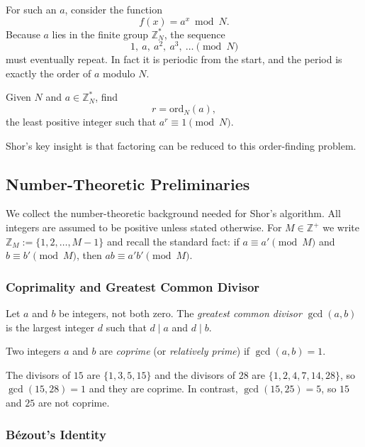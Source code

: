 For such an $a$, consider the function
\[
    f(x) = a^x \bmod N.
\]
Because $a$ lies in the finite group $\mathbb{Z}_N^*$, the sequence
\[
    1,\ a,\ a^2,\ a^3,\ \dots \pmod N
\]
must eventually repeat. In fact it is periodic from the start, and the period is exactly the order of $a$ modulo $N$.

\begin{definition}
Given $N$ and $a \in \mathbb{Z}_N^*$, find
\[
    r = \mathrm{ord}_N(a),
\]
the least positive integer such that $a^r \equiv 1 \pmod N$.
\end{definition}

Shor's key insight is that factoring can be reduced to this order-finding problem.

\subsection{Number-Theoretic Preliminaries}

We collect the number-theoretic background needed for Shor's algorithm. All integers are assumed to be positive unless stated otherwise. For $M \in \mathbb{Z}^+$ we write $\mathbb{Z}_M := \{1, 2, \dots, M-1\}$ and recall the standard fact: if $a \equiv a' \pmod{M}$ and $b \equiv b' \pmod{M}$, then $ab \equiv a'b' \pmod{M}$.

\subsubsection{Coprimality and Greatest Common Divisor}

\begin{definition}
Let $a$ and $b$ be integers, not both zero. The \emph{greatest common divisor} $\gcd(a,b)$ is the largest integer $d$ such that $d \mid a$ and $d \mid b$.
\end{definition}

\begin{definition}[Coprime]
Two integers $a$ and $b$ are \emph{coprime} (or \emph{relatively prime}) if $\gcd(a,b)=1$.
\end{definition}

\begin{example}
The divisors of $15$ are $\{1,3,5,15\}$ and the divisors of $28$ are $\{1,2,4,7,14,28\}$, so $\gcd(15,28)=1$ and they are coprime. In contrast, $\gcd(15,25)=5$, so $15$ and $25$ are not coprime.
\end{example}

\subsubsection{Bézout's Identity}

